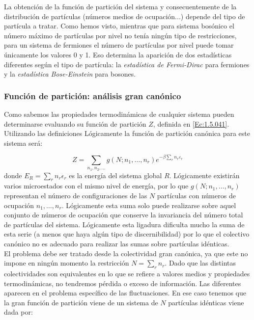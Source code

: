 \documentclass[12pt,a4paper]{article}
\numberwithin{equation}{section}
\numberwithin{figure}{section}
\theoremstyle{definition}
\begin{document}
La obtención de la función de partición del sistema y consecuentemente de la distribución de partículas (números medios de ocupación...) depende del tipo de partícula a tratar. Como hemos visto, mientras que para sistema bosónico el número máximo de partículas por nivel no tenía ningún tipo de restricciones, para un sistema de fermiones el número de partículas por nivel puede tomar únicamente los valores 0 y 1. Eso determina la aparición de dos estadísticas diferentes según el tipo de partícula: la \textit{estadística de Fermi-Dirac} para fermiones y la \textit{estadística Bose-Einstein} para bosones.

\subsubsection{Función de partición: análisis gran canónico}

Como sabemos las propiedades termodinámicas de cualquier sistema pueden determinarse evaluando su función de partición $Z$, definida en \ref{Ec:1.5.041}. Utilizando las definiciones
Lógicamente la función de partición canónica para este sistema será:

\begin{equation}
Z = \sum_{n_1,n_2,\ldots} g(N;n_1,\ldots,n_r) e^{-\beta \sum_r n_r \varepsilon_r}
\end{equation}
donde $E_R = \sum_r n_r \epsilon_r$ es la energía del sistema global $R$. Lógicamente existirán varios microestados con el mismo nivel de energía, por lo que $g(N;n_1,\ldots,n_r)$ representan el número de configuraciones de las $N$ partículas con números de ocupación $n_1,\ldots,n_r$. Lógicamente esta suma solo puede realizarse sobre aquel conjunto de números de ocupación que conserve la invariancia del número total de partículas del sistema. Lógicamente esta ligadura dificulta mucho la suma de esta serie (a menos que haya algún tipo de discernibilidad) por lo que el colectivo canónico no es adecuado para realizar las sumas sobre partículas idénticas.  \\

El problema debe ser tratado desde la colectividad gran canónica, ya que este no impone en ningún momento la restricción $N=\sum_r n_r$. Dado que las distintas colectividades son equivalentes en lo que se refiere a valores medios y propiedades termodinámicas, no tendremos pérdida o exceso de información. Las diferentes aparecen en el problema específico de las fluctuaciones. En ese caso tenemos que la gran función de partición viene de un sistema de $N$ partículas idénticas viene dada por:
\end{document}
